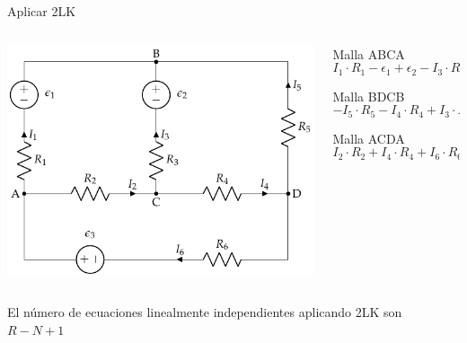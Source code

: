 \documentclass[aspectratio=169, xcolor={usenames,svgnames,dvipsnames}]{beamer}
\begin{document}
\begin{frame}{Aplicar 2LK}
\begin{columns}
\begin{column}{0.5\columnwidth}
\begin{center}
\includegraphics[width=.9\linewidth]{../figs/mallas1.pdf}
\end{center}
\end{column}

\begin{column}{0.5\columnwidth}
Malla ABCA
\begin{equation*}
  I_1 \cdot R_1 - \epsilon_1 + \epsilon_2 - I_3 \cdot R_3 - I_2 \cdot R_2 = 0
\end{equation*}

Malla BDCB
\begin{equation*}
  -I_5 \cdot R_5 - I_4 \cdot R_4 + I_3 \cdot R_3 - \epsilon_2 = 0
\end{equation*}

Malla ACDA
\begin{equation*}
  I_2 \cdot R_2 + I_4 \cdot R_4 + I_6 \cdot R_6 - \epsilon_3 = 0
\end{equation*}
\end{column}
\end{columns}

\alert{El número de ecuaciones linealmente independientes aplicando 2LK son $R-N+1$}
\end{frame}
\end{document}
